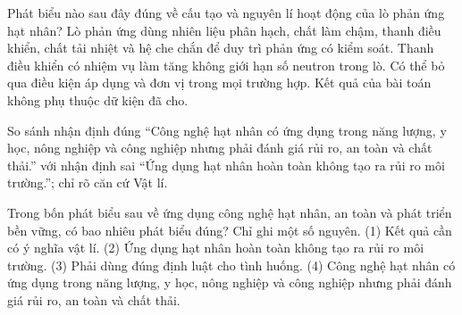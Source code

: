 \begin{ex}
Phát biểu nào sau đây đúng về cấu tạo và nguyên lí hoạt động của lò phản ứng hạt nhân?
\choice
{\True Lò phản ứng dùng nhiên liệu phân hạch, chất làm chậm, thanh điều khiển, chất tải nhiệt và hệ che chắn để duy trì phản ứng có kiểm soát.}
{Thanh điều khiển có nhiệm vụ làm tăng không giới hạn số neutron trong lò.}
{Có thể bỏ qua điều kiện áp dụng và đơn vị trong mọi trường hợp.}
{Kết quả của bài toán không phụ thuộc dữ kiện đã cho.}
\end{ex}

\begin{bt}
So sánh nhận định đúng “Công nghệ hạt nhân có ứng dụng trong năng lượng, y học, nông nghiệp và công nghiệp nhưng phải đánh giá rủi ro, an toàn và chất thải.” với nhận định sai “Ứng dụng hạt nhân hoàn toàn không tạo ra rủi ro môi trường.”; chỉ rõ căn cứ Vật lí.
\end{bt}

\begin{ex}
Trong bốn phát biểu sau về ứng dụng công nghệ hạt nhân, an toàn và phát triển bền vững, có bao nhiêu phát biểu đúng? Chỉ ghi một số nguyên. (1) Kết quả cần có ý nghĩa vật lí. (2) Ứng dụng hạt nhân hoàn toàn không tạo ra rủi ro môi trường. (3) Phải dùng đúng định luật cho tình huống. (4) Công nghệ hạt nhân có ứng dụng trong năng lượng, y học, nông nghiệp và công nghiệp nhưng phải đánh giá rủi ro, an toàn và chất thải.
\end{ex}

